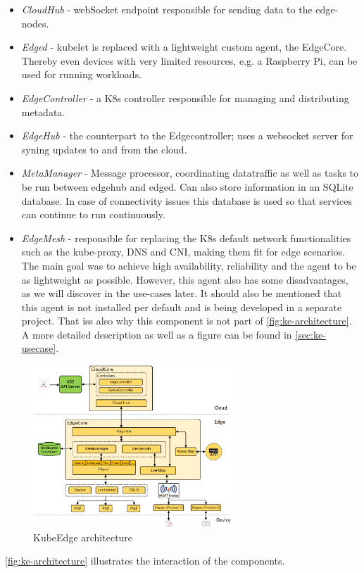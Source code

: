 \documentclass[MIC,Master,english]{twbook}%
\begin{document}
\begin{itemize}
    \item \textit{CloudHub} - webSocket endpoint responsible for sending data to the edge-nodes.
    \item \textit{Edged} - kubelet is replaced with a lightweight custom agent, the EdgeCore. Thereby even devices with very limited resources, e.g. a Raspberry Pi, can be used for running workloads.
    \item \textit{EdgeController} - a \ac{K8s} controller responsible for managing and distributing metadata.
    \item \textit{EdgeHub} - the counterpart to the Edgecontroller; uses a websocket server for syning updates to and from the cloud.
    \item \textit{MetaManager} - Message processor, coordinating datatraffic as well as tasks to be run between edgehub and edged. Can also store information in an SQLite database. In case of connectivity issues this database is used so that services can continue to run continuously.
    \item \textit{EdgeMesh} - responsible for replacing the \ac{K8s} default network functionalities such as the kube-proxy, \ac{DNS} and \ac{CNI}, making them fit for edge scenarios. The main goal was to achieve high availability, reliability and the agent to be as lightweight as possible. However, this agent also has some disadvantages, as we will discover in the use-cases later. It should also be mentioned that this agent is not installed per default and is being developed in a separate project. That iss also why this component is not part of \autoref{fig:ke-architecture}. A more detailed description as well as a figure can be found in \autoref{sec:ke-usecase}.
\end{itemize}

\begin{figure}[ht]
    \centering
    \includegraphics[width=0.67\textwidth]{PICs/kubeedge-arch.png}
    \caption{KubeEdge architecture\cite{ke-docs-why}}
    \label{fig:ke-architecture}
\end{figure}
\autoref{fig:ke-architecture} illustrates the interaction of the components. 
\end{document}
